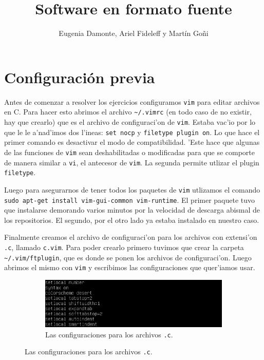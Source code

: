 \documentclass[11pt]{article}
\title{\Huge Software en formato fuente}
\author{Eugenia Damonte, Ariel Fideleff y Mart\'in Go\~ni}
\date{}
\begin{document}
	\maketitle
	\newpage
	\tableofcontents
	\newpage
	
	
	\section{Configuraci\'on previa}
		Antes de comenzar a resolver los ejercicios configuramos \texttt{vim} para editar archivos en C. Para hacer esto abrimos el archivo \texttt{\textasciitilde/.vimrc} (en todo caso de no existir, hay que crearlo) que es el archivo de configuraci'on de \texttt{vim}. Estaba vac'io por lo que le le a'nad'imos dos l'ineas: \texttt{set nocp} y \texttt{filetype plugin on}. Lo que hace el primer comando es desactivar el modo de compatibilidad. 'Este hace que algunas de las funciones de \texttt{vim} sean deshabilitadas o modificadas para que se comporte de manera similar a \texttt{vi}, el antecesor de \texttt{vim}. La segunda permite utlizar el plugin \texttt{filetype}.
		
		Luego para asegurarnos de tener todos los paquetes de \texttt{vim} utlizamos el comando \texttt{sudo apt-get install vim-gui-common vim-runtime}. El primer paquete tuvo que instalarse demorando varios minutos por la velocidad de descarga abismal de los repositorios. El segundo, por el otro lado ya estaba instalado en nuestro caso.
		
		Finalmente creamos el archivo de configuraci'on para los archivos con extensi'on \texttt{.c}, llamado \texttt{c.vim}. Para poder crearlo primero tuvimos que crear la carpeta \texttt{\textasciitilde/.vim/ftplugin}, que es donde se ponen los archivos de configuraci'on. Luego abrimos el mismo con \texttt{vim} y escribimos las configuraciones que quer'iamos usar.
		
		\begin{figure}[H]
			\centering
			\begin{subfigure}[b!]{0.7\linewidth}
				\includegraphics[width=\linewidth]{Images/Preamble/Preamble.PNG}
				\caption*{Las configuraciones para los archivos \texttt{.c}.}
			\end{subfigure}
		\end{figure}




















\end{document}
